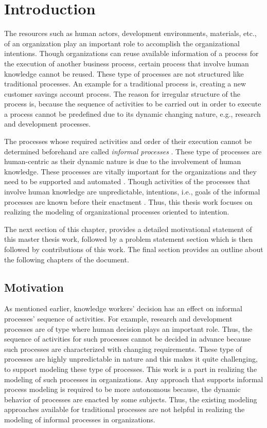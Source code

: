 \chapter{Introduction}
\label{chap:introduction}

The resources such as human actors, development environments, materials, etc., of an organization play an important role to accomplish the organizational intentions. Though organizations can reuse available information of a process for the execution of another business process, certain process that involve human knowledge cannot be reused. These type of processes are not structured like traditional processes. An example for a traditional process is, creating a new customer savings account process. The reason for irregular structure of the process is, because the sequence of activities to be carried out in order to execute a process cannot be predefined due to its dynamic changing nature, e.g., research and development processes.

The processes whose required activities and order of their execution cannot be determined beforehand are called \textit{informal processes} \cite{Sungur2014}. These type of processes are human-centric as their dynamic nature is due to the involvement of human knowledge. These processes are vitally important for the organizations and they need to be supported and automated \cite{Sungur2014a}. Though activities of the processes that involve human knowledge are unpredictable, intentions, i.e., goals of the informal processes are known before their enactment \cite{DiCiccio2015}. Thus, this thesis work focuses on realizing the modeling of organizational processes oriented to intention. 

The next section of this chapter, provides a detailed motivational statement of this master thesis work, followed by a problem statement section which is then followed by contributions of this work. The final section provides an outline about the following chapters of the document. 

\section{Motivation}
\label{sec:motivation}
As mentioned earlier, knowledge workers' decision has an effect on informal processes' sequence of activities. For example, research and development processes are of type where human decision plays an important role. Thus, the sequence of activities for such processes cannot be decided in advance because such processes are characterized with changing requirements. These type of processes are highly unpredictable in nature and this makes it quite challenging, to support modeling these type of processes. This work is a part in realizing the modeling of such processes in organizations. Any approach that supports informal process modeling is required to be more autonomous because, the dynamic behavior of processes are enacted by some subjects. Thus, the existing modeling approaches available for traditional processes are not helpful in realizing the modeling of informal processes in organizations.  

